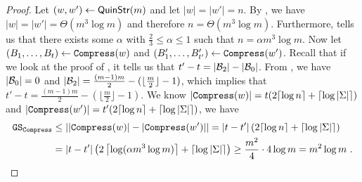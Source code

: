 \begin{proof}
Let $(w,w')\gets\mathsf{QuinStr}(m)$ and let $|w|=|w'|=n$. By , we have $|w|=|w'|=\Theta(m^3\log m)$ and therefore $n=\Theta(m^3\log m)$. Furthermore,  tells us that there exists some $\alpha$ with $\frac{2}{3}\leq\alpha\leq 1$ such that $n=\alpha m^3\log m$.  
Now let $(B_1,\ldots,B_t)\gets\mathtt{Compress}(w)$ and $(B'_1,\ldots,B'_{t'})\gets\mathtt{Compress}(w')$.
Recall that if we look at the proof of , it tells us that $t'-t=|{\mathcal{B}}_2|-|{\mathcal{B}}_0|$. From , we have $|{\mathcal{B}}_0|=0$ and $|{\mathcal{B}}_2|=\frac{(m-1)m}{2}-(\lfloor\frac{m}{2}\rfloor-1)$, which implies that $t'-t=\frac{(m-1)m}{2}-(\lfloor\frac{m}{2}\rfloor-1)$. We know $|\mathtt{Compress}(w)|=t(2\lceil\log n\rceil+\lceil\log|\Sigma|\rceil)$ and $|\mathtt{Compress}(w')|=t'(2\lceil\log n\rceil+\lceil\log|\Sigma|\rceil)$, we have
\begin{align*}
   \mathtt{GS}_{\mathtt{Compress}} & \leq  \left||\mathtt{Compress}(w)|-|\mathtt{Compress}(w')|\right|  
   = |t-t'|\left(2\lceil\log n\rceil+\lceil\log|\Sigma|\rceil\right) \\
    &= |t-t'|\left(2\left\lceil\log (\alpha m^3\log m)\right\rceil+\lceil\log|\Sigma|\rceil\right) 
    \geq \frac{m^2}{4}\cdot 4\log m = m^2\log m \ .
\end{align*}

\end{proof}

